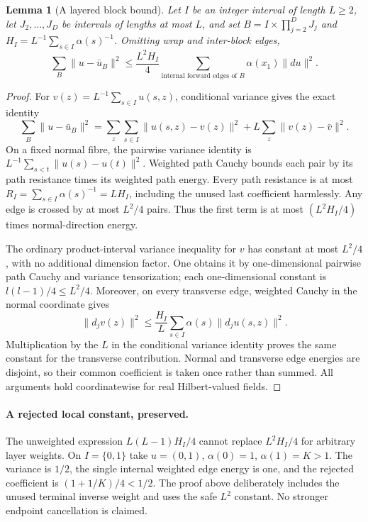 \documentclass[11pt]{article}
\newtheorem{lemma}{Lemma}
\begin{document}
\begin{lemma}[A layered block bound]\label{lem:block}
Let $I$ be an integer interval of length $L\ge2$, let $J_2,\ldots,J_D$ be intervals of lengths at most $L$, and set $B=I\times\prod_{j=2}^D J_j$ and $H_I=L^{-1}\sum_{s\in I}\alpha(s)^{-1}$. Omitting wrap and inter-block edges,
\[
 \sum_B\|u-\bar u_B\|^2\le\frac{L^2H_I}{4}
 \sum_{\text{internal forward edges of }B}\alpha(x_1)\|du\|^2.
\]
\end{lemma}
\begin{proof}
For $v(z)=L^{-1}\sum_{s\in I}u(s,z)$, conditional variance gives the exact identity
\[
 \sum_B\|u-\bar u_B\|^2=
 \sum_z\sum_{s\in I}\|u(s,z)-v(z)\|^2
 +L\sum_z\|v(z)-\bar v\|^2.
\]
On a fixed normal fibre, the pairwise variance identity is $L^{-1}\sum_{s<t}\|u(s)-u(t)\|^2$. Weighted path Cauchy bounds each pair by its path resistance times its weighted path energy. Every path resistance is at most $R_I=\sum_{s\in I}\alpha(s)^{-1}=LH_I$, including the unused last coefficient harmlessly. Any edge is crossed by at most $L^2/4$ pairs. Thus the first term is at most $(L^2H_I/4)$ times normal-direction energy.

The ordinary product-interval variance inequality for $v$ has constant at most $L^2/4$, with no additional dimension factor. One obtains it by one-dimensional pairwise path Cauchy and variance tensorization; each one-dimensional constant is $l(l-1)/4\le L^2/4$. Moreover, on every transverse edge, weighted Cauchy in the normal coordinate gives
\[
 \|d_jv(z)\|^2\le\frac{H_I}{L}\sum_{s\in I}\alpha(s)\|d_ju(s,z)\|^2.
\]
Multiplication by the $L$ in the conditional variance identity proves the same constant for the transverse contribution. Normal and transverse edge energies are disjoint, so their common coefficient is taken once rather than summed. All arguments hold coordinatewise for real Hilbert-valued fields.
\end{proof}

\paragraph{A rejected local constant, preserved.}
The unweighted expression $L(L-1)H_I/4$ cannot replace $L^2H_I/4$ for arbitrary layer weights. On $I=\{0,1\}$ take $u=(0,1)$, $\alpha(0)=1$, $\alpha(1)=K>1$. The variance is $1/2$, the single internal weighted edge energy is one, and the rejected coefficient is $(1+1/K)/4<1/2$. The proof above deliberately includes the unused terminal inverse weight and uses the safe $L^2$ constant. No stronger endpoint cancellation is claimed.
\end{document}
